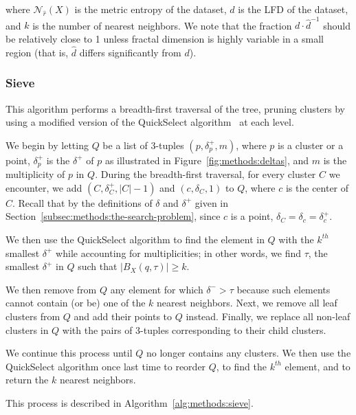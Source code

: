 where $\mathcal{N}_{\hat{r}}(X)$ is the metric entropy of the dataset, $d$ is the LFD of the dataset, and $k$ is the number of nearest neighbors.
We note that the fraction $d \cdot \hat{d}^{-1}$ should be relatively close to 1 unless fractal dimension is highly variable in a small region (that is, $\hat{d}$ differs significantly from $d$).


\subsubsection{Sieve}
\label{subsubsec:methods:knn:sieve}

This algorithm performs a breadth-first traversal of the tree, pruning clusters by using a modified version of the QuickSelect algorithm~\cite{hoare1961algorithm} at each level.

We begin by letting $Q$ be a list of 3-tuples $(p, \delta^{+}_{p}, m)$, where $p$ is a cluster or a point, $\delta^{+}_{p}$ is the $\delta^{+}$ of $p$ as illustrated in Figure~\ref{fig:methods:deltas}, and $m$ is the multiplicity of $p$ in $Q$.
During the breadth-first traversal, for every cluster $C$ we encounter, we add $(C, \delta^{+}_{C}, |C| - 1)$ and $(c, \delta_{C}, 1)$ to $Q$, where $c$ is the center of $C$.
Recall that by the definitions of $\delta$ and $\delta^{+}$ given in Section~\ref{subsec:methods:the-search-problem}, since $c$ is a point, $\delta_{C} = \delta_{c} = \delta^{+}_{c}$.



We then use the QuickSelect algorithm to find the element in $Q$ with the $k^{th}$ smallest $\delta^{+}$ while accounting for multiplicities; in other words, we find $\tau$, the smallest $\delta^{+}$ in $Q$ such that $\left| B_X(q, \tau) \right| \geq k$.

We then remove from $Q$ any element for which $\delta^{-} > \tau$ because such elements cannot contain (or be) one of the $k$ nearest neighbors.
Next, we remove all leaf clusters from $Q$ and add their points to $Q$ instead.
Finally, we replace all non-leaf clusters in $Q$ with the pairs of 3-tuples corresponding to their child clusters.

We continue this process until $Q$ no longer contains any clusters.
We then use the QuickSelect algorithm once last time to reorder $Q$, to find the $k^{th}$ element, and to return the $k$ nearest neighbors.

This process is described in Algorithm~\ref{alg:methods:sieve}. 

